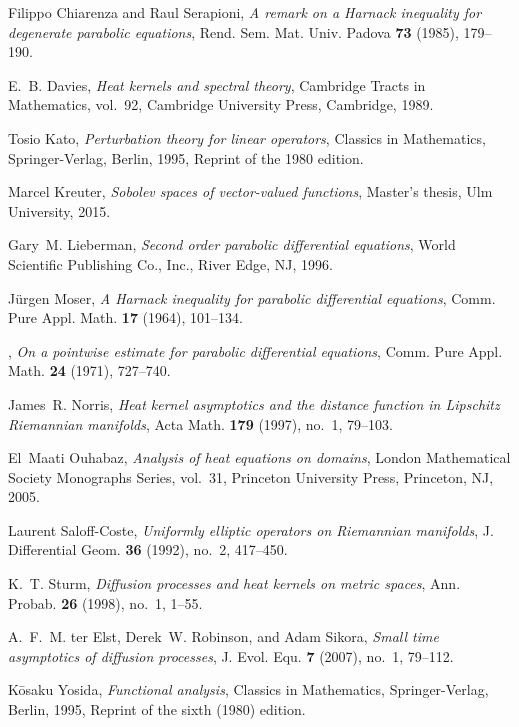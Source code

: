 \begin{thebibliography}{AKM06}
Filippo Chiarenza and Raul Serapioni, \emph{A remark on a {H}arnack inequality
  for degenerate parabolic equations}, Rend. Sem. Mat. Univ. Padova \textbf{73}
  (1985), 179--190. 

E.~B. Davies, \emph{Heat kernels and spectral theory}, Cambridge Tracts in
  Mathematics, vol.~92, Cambridge University Press, Cambridge, 1989. 

Tosio Kato, \emph{Perturbation theory for linear operators}, Classics in
  Mathematics, Springer-Verlag, Berlin, 1995, Reprint of the 1980 edition.

Marcel Kreuter, \emph{Sobolev spaces of vector-valued functions}, Master's
  thesis, Ulm University, 2015.

Gary~M. Lieberman, \emph{Second order parabolic differential equations}, World
  Scientific Publishing Co., Inc., River Edge, NJ, 1996. 

J\"urgen Moser, \emph{A {H}arnack inequality for parabolic differential
  equations}, Comm. Pure Appl. Math. \textbf{17} (1964), 101--134. 

\bysame, \emph{On a pointwise estimate for parabolic differential equations},
  Comm. Pure Appl. Math. \textbf{24} (1971), 727--740. 

James~R. Norris, \emph{Heat kernel asymptotics and the distance function in
  {L}ipschitz {R}iemannian manifolds}, Acta Math. \textbf{179} (1997), no.~1,
  79--103. 

El~Maati Ouhabaz, \emph{Analysis of heat equations on domains}, London
  Mathematical Society Monographs Series, vol.~31, Princeton University Press,
  Princeton, NJ, 2005. 

Laurent Saloff-Coste, \emph{Uniformly elliptic operators on {R}iemannian
  manifolds}, J. Differential Geom. \textbf{36} (1992), no.~2, 417--450.

K.~T. Sturm, \emph{Diffusion processes and heat kernels on metric spaces}, Ann.
  Probab. \textbf{26} (1998), no.~1, 1--55. 

A.~F.~M. ter Elst, Derek~W. Robinson, and Adam Sikora, \emph{Small time
  asymptotics of diffusion processes}, J. Evol. Equ. \textbf{7} (2007), no.~1,
  79--112. 

K\=osaku Yosida, \emph{Functional analysis}, Classics in Mathematics,
  Springer-Verlag, Berlin, 1995, Reprint of the sixth (1980) edition.

\end{thebibliography}
